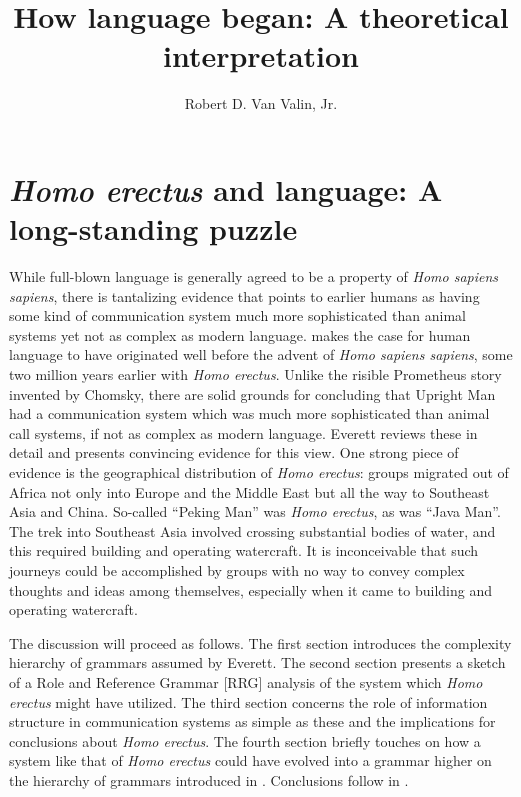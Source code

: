 \documentclass[output=paper,colorlinks,citecolor=brown]{langscibook}
\author[Robert D. {Van Valin, Jr.}]{Robert D. Van Valin, Jr.\orcid{}\affiliation{The State University of New York at Buffalo \& Heinrich Heine University Düsseldorf}}
\title{How language began: A theoretical interpretation}
\begin{document}
\maketitle

\section{\emph{Homo erectus} and language: A long-standing puzzle}
While full-blown language is generally agreed to be a property of \emph{Homo sapiens sapiens}, there is tantalizing evidence that points to earlier humans as having some kind of communication system much more sophisticated than animal systems yet not as complex as modern language. \citet{everett2017language} makes the case for human language to have originated well before the advent of \emph{Homo sapiens sapiens}, some two million years earlier with \emph{Homo erectus}. Unlike the risible Prometheus story invented by Chomsky, there are solid grounds for concluding that Upright Man had a communication system which was much more sophisticated than animal call systems, if not as complex as modern language.  Everett reviews these in detail and presents convincing evidence for this view.  One strong piece of evidence is the geographical distribution of \emph{Homo erectus}: groups migrated out of Africa not only into Europe and the Middle East but all the way to Southeast Asia and China.  So-called “Peking Man” was \emph{Homo erectus}, as was “Java Man”.  The trek into Southeast Asia involved crossing substantial bodies of water, and this required building and operating watercraft.  It is inconceivable that such journeys could be accomplished by groups with no way to convey complex thoughts and ideas among themselves, especially when it came to building and operating watercraft.  

The discussion will proceed as follows. The first section introduces the complexity hierarchy of grammars assumed by Everett.  The second section presents a sketch of a Role and Reference Grammar [RRG] \citep{van2005exploring,van1997syntax} analysis of the system which \emph{Homo erectus} might have utilized.  The third section concerns the role of information structure in communication systems as simple as these and the implications for conclusions about \emph{Homo erectus}.  The fourth section briefly touches on how a system like that of \emph{Homo erectus} could have evolved into a grammar higher on the hierarchy of grammars introduced in . Conclusions follow in .
\end{document}
